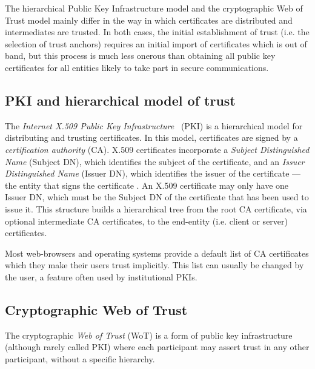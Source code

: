 \documentclass{llncs}
\begin{document}

The hierarchical Public Key Infrastructure model and the cryptographic
Web of Trust model mainly differ in the way in which certificates are
distributed and intermediates are trusted. In both cases, the initial
establishment of trust (i.e. the selection of trust anchors) requires
an initial import of certificates which is out of band, but this
process is much less onerous than obtaining all public key
certificates for all entities likely to take part in secure
communications.


\subsection{PKI and hierarchical model of trust}
\label{sec:pkix}

The {\em Internet X.509 Public Key Infrastructure}~\cite{rfc5280}
(PKI) is a hierarchical model for distributing and trusting
certificates. In this model, certificates are signed by a {\em
  certification authority} (CA). X.509 certificates incorporate a {\em
  Subject Distinguished Name} (Subject DN), which identifies the
subject of the certificate, and an {\em Issuer Distinguished Name}
(Issuer DN), which identifies the issuer of the certificate --- 
the entity that signs the certificate . An X.509
certificate may only have one Issuer DN, which must be the Subject DN
of the certificate that has been used to issue it. This structure builds
a hierarchical tree from the root CA certificate, via optional intermediate
CA certificates, to the end-entity (i.e. client or server) certificates.

Most web-browsers and operating systems provide a default list of CA certificates which
they make their users trust implicitly. This list can usually be changed
by the user, a feature often used by institutional PKIs.

\subsection{Cryptographic Web of Trust}
\label{sec:wot}

The cryptographic {\em Web of Trust} (WoT) is a form of public key
infrastructure (although rarely called PKI) where each
participant may assert trust in any other participant, without a
specific hierarchy.
\end{document}
